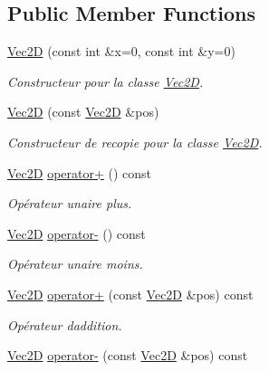 \subsection*{Public Member Functions}
\begin{DoxyCompactItemize}
\item 
\hyperlink{classns_graphics_1_1_vec2_d_a4a2fdd532ded3c29b7a3bd6e5a23fadf}{Vec2D} (const int \&x=0, const int \&y=0)
\begin{DoxyCompactList}\small\item\em Constructeur pour la classe \hyperlink{classns_graphics_1_1_vec2_d}{Vec2D}. \end{DoxyCompactList}\item 
\hyperlink{classns_graphics_1_1_vec2_d_ae409c698404abced934b589d58513767}{Vec2D} (const \hyperlink{classns_graphics_1_1_vec2_d}{Vec2D} \&pos)
\begin{DoxyCompactList}\small\item\em Constructeur de recopie pour la classe \hyperlink{classns_graphics_1_1_vec2_d}{Vec2D}. \end{DoxyCompactList}\item 
\hyperlink{classns_graphics_1_1_vec2_d}{Vec2D} \hyperlink{classns_graphics_1_1_vec2_d_aded521aea98ae5b1fdd19f4f9e2df74a}{operator+} () const
\begin{DoxyCompactList}\small\item\em Opérateur unaire plus. \end{DoxyCompactList}\item 
\hyperlink{classns_graphics_1_1_vec2_d}{Vec2D} \hyperlink{classns_graphics_1_1_vec2_d_a3cc10af3b04df2c6bf85460ced5c63a7}{operator-\/} () const
\begin{DoxyCompactList}\small\item\em Opérateur unaire moins. \end{DoxyCompactList}\item 
\hyperlink{classns_graphics_1_1_vec2_d}{Vec2D} \hyperlink{classns_graphics_1_1_vec2_d_a59d565535347c6d0974be9a2333a5806}{operator+} (const \hyperlink{classns_graphics_1_1_vec2_d}{Vec2D} \&pos) const
\begin{DoxyCompactList}\small\item\em Opérateur d\textquotesingle{}addition. \end{DoxyCompactList}\item 
\hyperlink{classns_graphics_1_1_vec2_d}{Vec2D} \hyperlink{classns_graphics_1_1_vec2_d_a6431bcd5dd86fbaf119bed9cf01a13f2}{operator-\/} (const \hyperlink{classns_graphics_1_1_vec2_d}{Vec2D} \&pos) const

\end{DoxyCompactItemize}

